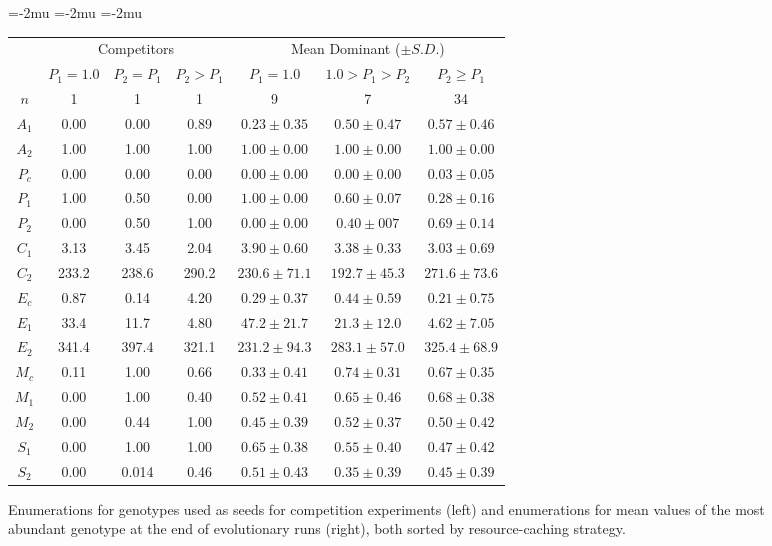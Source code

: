 \begin{figure}%

\begin{center}
\setlength\tabcolsep{1.5pt} %
\medmuskip=-2mu
\thinmuskip=-2mu
\thickmuskip=-2mu
\nulldelimiterspace=-1pt
\scriptspace=0pt
\begin{tabular}{ | c || c c c | c c c | }
  \multicolumn{1}{c}{} & \multicolumn{3}{c}{Competitors} & \multicolumn{3}{c}{Mean Dominant ($\pm S.D.$)} \\
 \cline{2-7}
  \multicolumn{1}{c|}{} & \tiny{$P_{1} = 1.0$} & \tiny{$P_{2} = P_{1}$} & \tiny{$P_{2} > P_{1}$} & \tiny{$P_{1} = 1.0$} & \tiny{$1.0 > P_{1} > P_{2}$} & \tiny{$P_{2} \geq P_{1}$}  \\
 \hline
 $n$ & 1 & 1 & 1 & 9 & 7 & 34  \\
 \hhline{|=||===|===|}
 $A_1$ & 0.00 & 0.00 & 0.89 & $0.23 \pm 0.35$ & $0.50 \pm 0.47$ & $0.57 \pm 0.46$ \\
 $A_2$ & 1.00 & 1.00 & 1.00 & $1.00 \pm  0.00$ & $1.00 \pm 0.00$ & $1.00 \pm 0.00$ \\
 \hline
 $P_{c}$ & 0.00 & 0.00 & 0.00 & $0.00 \pm 0.00$ & $0.00 \pm 0.00$ & $0.03 \pm 0.05$ \\
 $P_1$ & 1.00 & 0.50 & 0.00 & $1.00 \pm 0.00$ & $0.60 \pm 0.07$ & $0.28 \pm 0.16$ \\
 $P_2$ & 0.00 & 0.50 & 1.00 & $0.00 \pm 0.00$ & $0.40 \pm 007$ & $0.69 \pm 0.14$ \\
 \hline
 $C_1$ & 3.13 & 3.45 & 2.04 & $3.90 \pm 0.60$ & $3.38 \pm 0.33$ & $3.03 \pm 0.69$ \\
 $C_2$ & 233.2 & 238.6 & 290.2 & $230.6 \pm 71.1$ & $192.7 \pm 45.3$ & $271.6 \pm 73.6 $ \\
 \hline
 $E_{c}$ & 0.87 & 0.14 & 4.20 & $0.29 \pm 0.37$ & $0.44 \pm 0.59$ & $0.21 \pm 0.75$ \\
 $E_1$ & 33.4 & 11.7 & 4.80 & $47.2 \pm 21.7$ & $21.3 \pm 12.0$ & $4.62 \pm 7.05$ \\
 $E_2$ & 341.4 & 397.4 & 321.1 & $231.2 \pm 94.3$ & $283.1 \pm 57.0$ & $325.4 \pm 68.9$ \\
 \hline
 $M_{c}$ & 0.11 & 1.00 & 0.66 & $0.33 \pm 0.41$ & $0.74 \pm 0.31$ & $0.67 \pm 0.35$ \\
 $M_1$ & 0.00 & 1.00 & 0.40 & $0.52 \pm 0.41$ & $0.65 \pm 0.46$ & $0.68 \pm 0.38$ \\
 $M_2$ & 0.00 & 0.44 & 1.00 & $0.45 \pm 0.39$ & $0.52 \pm 0.37$ & $0.50 \pm 0.42$ \\
 \hline
 $S_1$ & 0.00 & 1.00 & 1.00 & $0.65 \pm 0.38$ & $0.55 \pm 0.40$ & $0.47 \pm 0.42$ \\
 $S_2$ & 0.00 & 0.014 & 0.46 & $0.51 \pm 0.43$ & $0.35 \pm 0.39$ & $0.45 \pm 0.39$ \\
 \hline
\end{tabular}
\end{center}
\caption{
Enumerations for genotypes used as seeds for competition experiments (left) and enumerations for mean values of the most abundant genotype at the end of evolutionary runs (right), both sorted by resource-caching strategy.
}
\label{fig:genotypes}
\end{figure}
